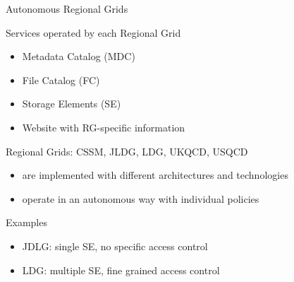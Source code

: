 \documentclass[aspectratio=169,xcolor=dvipsnames]{beamer}
\begin{document}
\begin{frame}{Autonomous Regional Grids}

  \begin{block}{Services operated by each Regional Grid}
    \begin{itemize}
    \item Metadata Catalog (MDC)
    \item File Catalog (FC)
    \item Storage Elements (SE)
    \item Website with RG-specific information
    \end{itemize}
  \end{block}

  \vspace*{5mm}
   Regional Grids: CSSM, JLDG, LDG, UKQCD, USQCD
    \begin{itemize}
    \item are implemented with different architectures and technologies
    \item operate in an autonomous way with individual policies
    \end{itemize}

    Examples
    \begin{itemize}
    \item JDLG: single SE, no specific access control
    \item LDG: multiple SE, fine grained access control
    \end{itemize}

\end{frame}
\end{document}
